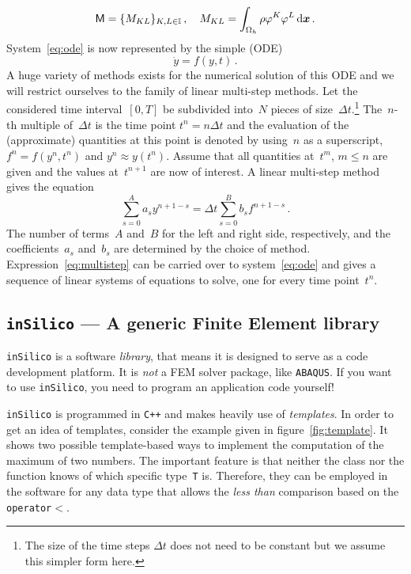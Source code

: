 \documentclass[a4paper,DIV=12,10pt]{scrartcl}
\newcommand{\vek}[1]{\boldsymbol{#1}}  %
\newcommand{\mat}[1]{\mathsf{#1}}      %
\newcommand{\x}[0]{\vek{x}}
\newcommand{\IS}[0]{\texttt{inSilico}}
\begin{document}
\begin{equation}
  \label{eq:mass}
  \mat{M} = \{M_{KL}\}_{K,L \in \mathbb{I}}\,,\quad
  M_{KL} = \int_{\Omega_h} \rho \varphi^K \varphi^L \dif \x\,.
\end{equation}
System~\eqref{eq:ode} is now represented by the simple (ODE)
\begin{equation}
  \label{eq:simpleOde}
  \dot{y} = f(y,t)\,.
\end{equation}
A huge variety of methods exists for the numerical solution of this
ODE and we will restrict ourselves to the family of linear multi-step
methods. Let the considered time interval~$[0,T]$ be subdivided
into~$N$ pieces of size~$\Delta t$.\footnote{The size of the time
  steps $\Delta t$ does not need to be constant but we assume this
  simpler form here.}  The~$n$-th multiple of~$\Delta t$ is the time
point $t^n = n \Delta t$ and the evaluation of the (approximate)
quantities at this point is denoted by using~$n$ as a superscript,
$f^n = f(y^n, t^n)$ and $y^n \approx y(t^n)$. Assume that all
quantities at~$t^m$, $m \leq n$ are given and the values at~$t^{n+1}$
are now of interest.  A linear multi-step method gives the equation
\begin{equation}
  \label{eq:multistep}
  \sum_{s=0}^A a_s y^{n+1-s} = \Delta t\sum_{s=0}^B b_s f^{n+1-s}\,.
\end{equation}
The number of terms~$A$ and~$B$ for the left and right side,
respectively, and the coefficients~$a_s$ and~$b_s$ are determined by
the choice of method. Expression~\eqref{eq:multistep} can be carried
over to system~\eqref{eq:ode} and gives a sequence of linear systems
of equations to solve, one for every time point~$t^n$.

\subsection{\texttt{inSilico} --- A generic Finite Element library}
\label{sec:insili}

\IS{} is a software \emph{library}, that means it is designed to serve
as a code development platform. It is \emph{not} a FEM solver package,
like \texttt{ABAQUS}. If you want to use \IS, you need to program an
application code yourself!

\IS{} is programmed in \texttt{C++} and makes heavily use of
\emph{templates}. In order to get an idea of templates, consider the
example given in figure~\ref{fig:template}. It shows two possible
template-based ways to implement the computation of the maximum of two
numbers. The important feature is that neither the class nor the
function knows of which specific type~\texttt{T} is. Therefore, they can
be employed in the software for any data type that allows the
\emph{less than} comparison based on the \texttt{operator$<$}.
\end{document}
